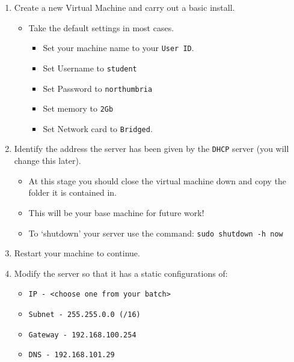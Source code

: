 \documentclass[11pt]{article}
\begin{document}
\begin{enumerate}
    \item Create a new Virtual Machine and carry out a basic install.
        \begin{itemize}
            \item Take the default settings in most cases.
                \begin{itemize}
                    \item Set your machine name to your \texttt{User ID}.
                    \item Set Username to \texttt{student}
                    \item Set Password to \texttt{northumbria}
                    \item Set memory to \texttt{2Gb}
                    \item Set Network card to \texttt{Bridged}.
                \end{itemize}
        \end{itemize}
    \item Identify the address the server has been given by the \texttt{DHCP} server (you will change this later). 
        \begin{tcolorbox}[title={\textbf{Notes:}}]
            \begin{itemize}
                \item At this stage you should close the virtual machine down and copy the folder it is contained in. 
                \item This will be your base machine for future work!
                \item To `shutdown' your server use the command: \texttt{sudo shutdown -h now} 
            \end{itemize}
        \end{tcolorbox}
    \item Restart your machine to continue.
    \item Modify the server so that it has a static configurations of: 
        \begin{itemize}
            \item \texttt{IP - <choose one from your batch>}
            \item \texttt{Subnet - 255.255.0.0 (/16)}
            \item \texttt{Gateway - 192.168.100.254}
            \item \texttt{DNS - 192.168.101.29}
        \end{itemize}

\end{enumerate}
\end{document}
